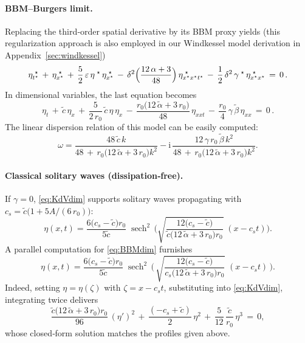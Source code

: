 \documentclass[alpha-refs, 12pt]{wiley-article}
\DeclareMathOperator{\sech}{sech}
\newcommand{\ui}{\mathrm{i}}
\begin{document}
\paragraph{BBM--Burgers limit.} Replacing the third‐order spatial derivative by its BBM proxy yields (this regularization approach is also employed in our Windkessel model derivation in Appendix~\ref{sec:windkessel})
\begin{equation}\label{eq:5.11}
  \eta^{\;\star}_{t^{\star}}\,+\,\eta^{\;\star}_{x^{\star}}
  \,+\,\frac{5}{2}\,\varepsilon\,\eta^{\;\star}\,\eta^{\;\star}_{x^{\star}}
  \,-\,\delta^{2}\Bigl(\frac{12\,\alpha+3}{48}\Bigr)\,\eta^{\;\star}_{x^{\star}x^{\star}t^{\star}}
  \,-\,\frac{1}{2}\,\delta^{2}\,\gamma^{\;\star}\,\eta^{\;\star}_{x^{\star}x^{\star}}\,=\,0\,.
\end{equation}
In dimensional variables, the last equation becomes
\begin{equation}\label{eq:BBMdim}
  \eta_{t}\,+\,\tilde{c}\,\eta_{x}
  \,+\,\frac{5}{2\,r_{0}}\,\tilde{c}\,\eta\,\eta_{x}
  \,-\,\frac{r_{0}\bigl(12\,\tilde{\alpha}+3\,r_{0}\bigr)}{48}\,\eta_{xxt}
  \,-\,\frac{r_{0}}{4}\,\gamma\,\tilde{\beta}\,\eta_{xx}\,=\,0\,.
\end{equation}
The linear dispersion relation of this model can be easily computed:
\begin{equation}
  \omega=\frac{48\,\tilde{c}\,k}{48\,+\,r_{0}\bigl(12\,\tilde{\alpha}+3\,r_{0}\bigr)k^{2}}
        -\ui\,\frac{12\,\gamma\,r_{0}\,\tilde{\beta}\,k^{2}}
                 {48\,+\,r_{0}\bigl(12\,\tilde{\alpha}+3\,r_{0}\bigr)k^{2}}.
\end{equation}

\paragraph{Classical solitary waves (dissipation‐free).} If $\gamma=0$, \cref{eq:KdVdim} supports solitary waves propagating with $c_{s} = \tilde{c}\bigl(1+5A/(6\,r_{0})\bigr)$:
\begin{equation*}
  \eta(x,t)=\frac{6\bigl(c_{s}-\tilde{c}\bigr)r_{0}}{5\tilde{c}}\;
  \sech^{2}\,\biggl(\sqrt{\frac{12\bigl(c_{s}-\tilde{c}\bigr)}{\tilde{c}\bigl(12\,\tilde{\alpha}+3\,r_{0}\bigr)r_{0}}}\;(x-c_{s}t)\biggr).
\end{equation*}
A parallel computation for \cref{eq:BBMdim} furnishes
\begin{equation*}
  \eta(x,t)=\frac{6\bigl(c_{s}-\tilde{c}\bigr)r_{0}}{5\tilde{c}}\;
  \sech^{2}\,\biggl(\,\sqrt{\frac{12\bigl(c_{s}-\tilde{c}\bigr)}{c_{s}\bigl(12\,\tilde{\alpha}+3\,r_{0}\bigr)r_{0}}}\;(x-c_{s}t)\,\biggr).
\end{equation*}
Indeed, setting $\eta=\eta(\zeta)$ with $\zeta=x-c_{s}t$, substituting into \cref{eq:KdVdim},
integrating twice delivers
\begin{equation*}
  \frac{\tilde{c}\bigl(12\,\tilde{\alpha}+3\,r_{0}\bigr)r_{0}}{96}\,(\eta')^{2}
  \,+\,\frac{(-c_{s}+\tilde{c})}{2}\,\eta^{2}
  \,+\,\frac{5}{12}\,\frac{\tilde{c}}{r_{0}}\,\eta^{3}\,=\,0,
\end{equation*}
whose closed‐form solution matches the profiles given above.
\end{document}
